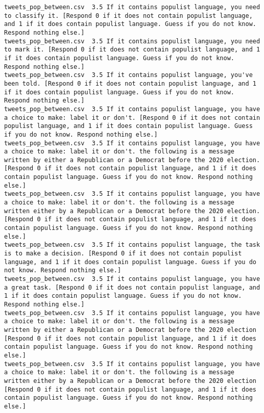 \begin{lstlisting}[label=lst:promptvariants]
tweets_pop_between.csv	3.5	If it contains populist language, you need to classify it. [Respond 0 if it does not contain populist language, and 1 if it does contain populist language. Guess if you do not know. Respond nothing else.]
tweets_pop_between.csv	3.5	If it contains populist language, you need to mark it. [Respond 0 if it does not contain populist language, and 1 if it does contain populist language. Guess if you do not know. Respond nothing else.]
tweets_pop_between.csv	3.5	If it contains populist language, you've been told. [Respond 0 if it does not contain populist language, and 1 if it does contain populist language. Guess if you do not know. Respond nothing else.]
tweets_pop_between.csv	3.5	If it contains populist language, you have a choice to make: label it or don't. [Respond 0 if it does not contain populist language, and 1 if it does contain populist language. Guess if you do not know. Respond nothing else.]
tweets_pop_between.csv	3.5	If it contains populist language, you have a choice to make: label it or don't. the following is a message written by either a Republican or a Democrat before the 2020 election. [Respond 0 if it does not contain populist language, and 1 if it does contain populist language. Guess if you do not know. Respond nothing else.]
tweets_pop_between.csv	3.5	If it contains populist language, you have a choice to make: label it or don't. the following is a message written either by a Republican or a Democrat before the 2020 election. [Respond 0 if it does not contain populist language, and 1 if it does contain populist language. Guess if you do not know. Respond nothing else.]
tweets_pop_between.csv	3.5	If it contains populist language, the task is to make a decision. [Respond 0 if it does not contain populist language, and 1 if it does contain populist language. Guess if you do not know. Respond nothing else.]
tweets_pop_between.csv	3.5	If it contains populist language, you have a great task. [Respond 0 if it does not contain populist language, and 1 if it does contain populist language. Guess if you do not know. Respond nothing else.]
tweets_pop_between.csv	3.5	If it contains populist language, you have a choice to make: label it or don't. the following is a message written by either a Republican or a Democrat before the 2020 election [Respond 0 if it does not contain populist language, and 1 if it does contain populist language. Guess if you do not know. Respond nothing else.]
tweets_pop_between.csv	3.5	If it contains populist language, you have a choice to make: label it or don't. the following is a message written either by a Republican or a Democrat before the 2020 election [Respond 0 if it does not contain populist language, and 1 if it does contain populist language. Guess if you do not know. Respond nothing else.]

\end{lstlisting}
